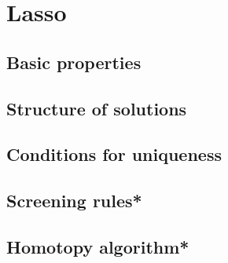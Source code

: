\chapter{Lasso}
\label{chap:lasso}


\section{Basic properties}

\section{Structure of solutions}
\label{sec:lasso_structure}


\section{Conditions for uniqueness}

\section{Screening rules*}

\section{Homotopy algorithm*}

